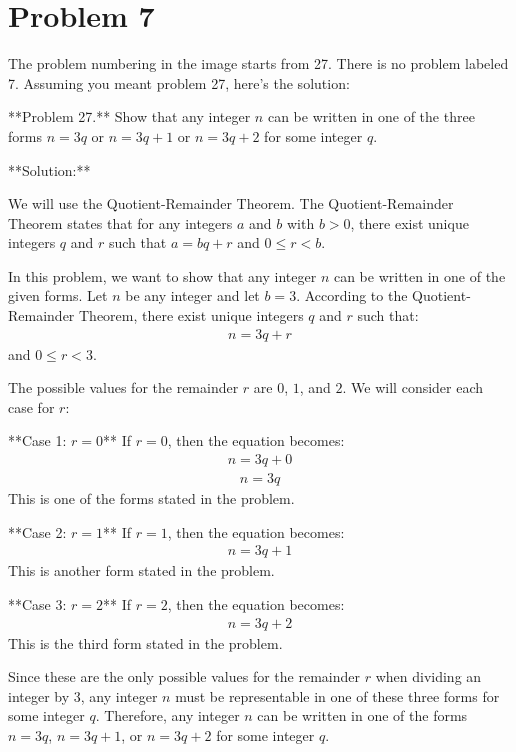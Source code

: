 \documentclass{article}
\begin{document}
\newpage

\section*{Problem 7}
The problem numbering in the image starts from 27. There is no problem labeled 7. Assuming you meant problem 27, here's the solution:

**Problem 27.** Show that any integer $n$ can be written in one of the three forms $n = 3q$ or $n = 3q + 1$ or $n = 3q + 2$ for some integer $q$.

**Solution:**

We will use the Quotient-Remainder Theorem. The Quotient-Remainder Theorem states that for any integers $a$ and $b$ with $b > 0$, there exist unique integers $q$ and $r$ such that $a = bq + r$ and $0 \le r < b$.

In this problem, we want to show that any integer $n$ can be written in one of the given forms. Let $n$ be any integer and let $b=3$. According to the Quotient-Remainder Theorem, there exist unique integers $q$ and $r$ such that:
\begin{align*} n = 3q + r \end{align*}
and $0 \le r < 3$.

The possible values for the remainder $r$ are $0$, $1$, and $2$. We will consider each case for $r$:

**Case 1: $r = 0$**
If $r = 0$, then the equation becomes:
\begin{align*} n = 3q + 0 \end{align*}
\begin{align*} n = 3q \end{align*}
This is one of the forms stated in the problem.

**Case 2: $r = 1$**
If $r = 1$, then the equation becomes:
\begin{align*} n = 3q + 1 \end{align*}
This is another form stated in the problem.

**Case 3: $r = 2$**
If $r = 2$, then the equation becomes:
\begin{align*} n = 3q + 2 \end{align*}
This is the third form stated in the problem.

Since these are the only possible values for the remainder $r$ when dividing an integer by 3, any integer $n$ must be representable in one of these three forms for some integer $q$. Therefore, any integer $n$ can be written in one of the forms $n = 3q$, $n = 3q + 1$, or $n = 3q + 2$ for some integer $q$.
\end{document}
